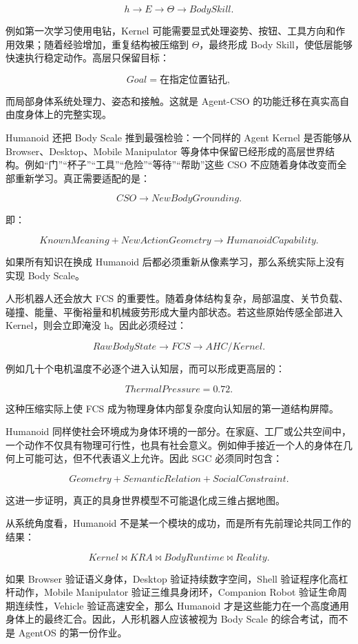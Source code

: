 $$
h
\rightarrow
E
\rightarrow
\Theta
\rightarrow
BodySkill.
$$

例如第一次学习使用电钻，Kernel 可能需要显式处理姿势、按钮、工具方向和作用效果；随着经验增加，重复结构被压缩到 $\Theta$，最终形成 Body Skill，使低层能够快速执行稳定动作。高层只保留目标：

$$
Goal=\text{在指定位置钻孔},
$$

而局部身体系统处理力、姿态和接触。这就是 Agent-CSO 的功能迁移在真实高自由度身体上的完整实现。

Humanoid 还把 Body Scale 推到最强检验：一个同样的 Agent Kernel 是否能够从 Browser、Desktop、Mobile Manipulator 等身体中保留已经形成的高层世界结构。例如“门”“杯子”“工具”“危险”“等待”“帮助”这些 CSO 不应随着身体改变而全部重新学习。真正需要适配的是：

$$
CSO
\rightarrow
NewBodyGrounding.
$$

即：

$$
KnownMeaning
+
NewActionGeometry
\rightarrow
HumanoidCapability.
$$

如果所有知识在换成 Humanoid 后都必须重新从像素学习，那么系统实际上没有实现 Body Scale。

人形机器人还会放大 FCS 的重要性。随着身体结构复杂，局部温度、关节负载、碰撞、能量、平衡裕量和机械疲劳形成大量内部状态。若这些原始传感全部进入 Kernel，则会立即淹没 h。因此必须经过：

$$
RawBodyState
\rightarrow
FCS
\rightarrow
AHC/Kernel.
$$

例如几十个电机温度不必逐个进入认知层，而可以形成更高层的：

$$
ThermalPressure=0.72.
$$

这种压缩实际上使 FCS 成为物理身体内部复杂度向认知层的第一道结构屏障。

Humanoid 同样使社会环境成为身体环境的一部分。在家庭、工厂或公共空间中，一个动作不仅具有物理可行性，也具有社会意义。例如伸手接近一个人的身体在几何上可能可达，但不代表语义上允许。因此 SGC 必须同时包含：

$$
Geometry
+
SemanticRelation
+
SocialConstraint.
$$

这进一步证明，真正的具身世界模型不可能退化成三维占据地图。

从系统角度看，Humanoid 不是某一个模块的成功，而是所有先前理论共同工作的结果：

$$
\boxed{
Kernel
\bowtie
KRA
\bowtie
BodyRuntime
\bowtie
Reality.
}
$$

如果 Browser 验证语义身体，Desktop 验证持续数字空间，Shell 验证程序化高杠杆动作，Mobile Manipulator 验证三维具身闭环，Companion Robot 验证生命周期连续性，Vehicle 验证高速安全，那么 Humanoid 才是这些能力在一个高度通用身体上的最终汇合。因此，人形机器人应该被视为 Body Scale 的综合考试，而不是 AgentOS 的第一份作业。

